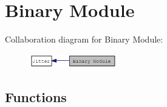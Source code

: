 \hypertarget{group__binmod}{
\section{Binary Module}
\label{group__binmod}
}


Collaboration diagram for Binary Module:\nopagebreak
\begin{figure}[H]
\begin{center}
\leavevmode
\includegraphics[width=108pt]{group__binmod}
\end{center}
\end{figure}
\subsection*{Functions}
